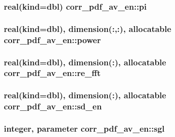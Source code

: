\hypertarget{classcorr__pdf__av__en_a26fd2560f4c18ba8768cb7998b773f14}{
\subsubsection[{pi}]{\setlength{\rightskip}{0pt plus 5cm}real(kind={\bf dbl}) corr\+\_\+pdf\+\_\+av\+\_\+en\+::pi}}\label{classcorr__pdf__av__en_a26fd2560f4c18ba8768cb7998b773f14}
\hypertarget{classcorr__pdf__av__en_a60af17407fad1ee58ffe7fea9be7493e}{
\subsubsection[{power}]{\setlength{\rightskip}{0pt plus 5cm}real(kind={\bf dbl}), dimension(\+:,\+:), allocatable corr\+\_\+pdf\+\_\+av\+\_\+en\+::power}}\label{classcorr__pdf__av__en_a60af17407fad1ee58ffe7fea9be7493e}
\hypertarget{classcorr__pdf__av__en_a103eb830c35d0f4221a6b1f9ef5f9e76}{
\subsubsection[{re\+\_\+fft}]{\setlength{\rightskip}{0pt plus 5cm}real(kind={\bf dbl}), dimension(\+:), allocatable corr\+\_\+pdf\+\_\+av\+\_\+en\+::re\+\_\+fft}}\label{classcorr__pdf__av__en_a103eb830c35d0f4221a6b1f9ef5f9e76}
\hypertarget{classcorr__pdf__av__en_ad6852462582e935a9b01ca0b6929a235}{
\subsubsection[{sd\+\_\+en}]{\setlength{\rightskip}{0pt plus 5cm}real(kind={\bf dbl}), dimension(\+:), allocatable corr\+\_\+pdf\+\_\+av\+\_\+en\+::sd\+\_\+en}}\label{classcorr__pdf__av__en_ad6852462582e935a9b01ca0b6929a235}
\hypertarget{classcorr__pdf__av__en_a5ec9ccef939e9ee720d5f36f9c6da620}{
\subsubsection[{sgl}]{\setlength{\rightskip}{0pt plus 5cm}integer, parameter corr\+\_\+pdf\+\_\+av\+\_\+en\+::sgl}}\label{classcorr__pdf__av__en_a5ec9ccef939e9ee720d5f36f9c6da620}

